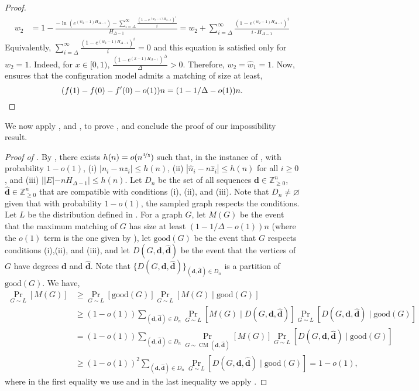 \documentclass[11pt]{article}
\DeclareMathOperator*{\CM}{CM}
\begin{document}
\begin{proof}
\begin{align*}
    w_2 &= 1 - \frac{-\ln(e^{(w_2-1)H_{\Delta-1}}) - \sum_{i=\Delta}^\infty \frac{\left(1-e^{(w_2-1)H_{\Delta-1}}\right)^i}{i}}{H_{\Delta-1}} = w_2 + \sum_{i=\Delta}^\infty \frac{\left(1 - e^{(w_2-1)H_{\Delta-1}}\right)^i}{i\cdot H_{\Delta-1}}
\end{align*}
Equivalently,
$
\sum_{i=\Delta}^\infty \frac{\left(1 - e^{(w_2-1)H_{\Delta-1}}\right)^i}{i} = 0
$
and this equation is satisfied only for $w_2 = 1$. Indeed, for $x\in[0,1)$, $\frac{(1-e^{(x-1)H_{\Delta-1}})^\Delta}{\Delta} > 0$. Therefore, $w_2 = \hat{w}_1=1$. Now,  ensures that the configuration model admits a matching of size at least,
\[
(f(1) - f(0) - f'(0) - o(1))n = (1 - 1/\Delta - o(1))n.  \qedhere
\]
\end{proof}
We now apply ,  and , to prove , and conclude the proof of our impossibility result.
\begin{proof}[Proof of ]
\newcommand{\good}{\text{good}}
By , there exists $h(n)=o(n^{\nicefrac45})$ such that, in the instance of , with probability $1-o(1)$, (i) $|n_i - nz_i| \leq h(n)$, (ii) $|\hat{n}_i - n\hat{z}_i| \leq h(n)$ for all $i\geq 0$, and (iii) $| |E| - n H_{\Delta-1}| \leq h(n)$. Let $D_n$ be the set of all sequences $\mathbf{d}\in\mathbb{Z}_{\geq0}^n$, $\mathbf{\hat{d}}\in\mathbb{Z}_{\geq0}^n$ that are compatible with conditions (i), (ii), and (iii). Note that $D_n\neq\varnothing$ given that with probability $1-o(1)$, the sampled graph respects the conditions. Let $L$ be the distribution defined in . For a graph $G$, let $M(G)$ be the event that the maximum matching of $G$ has size at least $(1-1/\Delta-o(1))n$ (where the $o(1)$ term is the one given by ), let $\good(G)$ be the event that $G$ respects conditions (i),(ii), and (iii), and let $D(G, \mathbf{d}, \mathbf{\hat{d}})$ be the event that the vertices of $G$ have degrees $\mathbf{d}$ and $\mathbf{\hat{d}}$. Note that $\{D(G,\mathbf{d}, \mathbf{\hat{d}})\}_{(\mathbf{d}, \mathbf{\hat{d}})\in D_n}$ is a partition of $\good(G)$. We have,
\begin{align*}
\Pr_{G\sim L}\left[M(G)\right] & \geq \Pr_{G\sim L}[\good(G)]\Pr_{G\sim L}[M(G) \mid \good(G)] \\
& \geq (1-o(1)) \sum_{(\mathbf{d}, \mathbf{\hat{d}})\in D_n} \Pr_{G\sim L}[M(G) \mid D(G,\mathbf{d}, \mathbf{\hat{d}})] \Pr_{G\sim L}[D(G,\mathbf{d}, \mathbf{\hat{d}})\mid \good(G)]\\
& = (1-o(1))\sum_{(\mathbf{d}, \mathbf{\hat{d}})\in D_n} \Pr_{G\sim \CM(\mathbf{d}, \mathbf{\hat{d}})}[M(G)] \Pr_{G\sim L}[D(G,\mathbf{d}, \mathbf{\hat{d}})\mid \good(G)] \\
& \geq (1-o(1))^2 \sum_{(\mathbf{d}, \mathbf{\hat{d}})\in D_n} \Pr_{G\sim L}[D(G,\mathbf{d}, \mathbf{\hat{d}})\mid \good(G)] = 1-o(1),
\end{align*}
where in the first equality we use  and in the last inequality we apply .
\end{proof}
\end{document}
